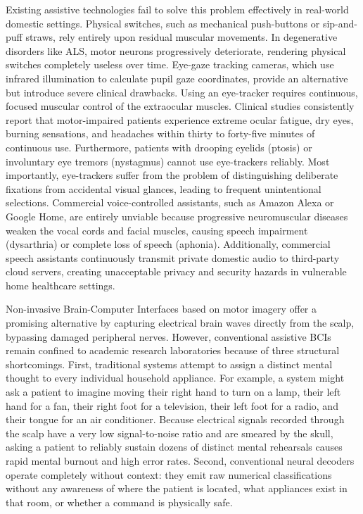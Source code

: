 \documentclass[12pt,a4paper]{report}
\begin{document}
Existing assistive technologies fail to solve this problem effectively in real-world domestic settings. Physical switches, such as mechanical push-buttons or sip-and-puff straws, rely entirely upon residual muscular movements. In degenerative disorders like ALS, motor neurons progressively deteriorate, rendering physical switches completely useless over time. Eye-gaze tracking cameras, which use infrared illumination to calculate pupil gaze coordinates, provide an alternative but introduce severe clinical drawbacks. Using an eye-tracker requires continuous, focused muscular control of the extraocular muscles. Clinical studies consistently report that motor-impaired patients experience extreme ocular fatigue, dry eyes, burning sensations, and headaches within thirty to forty-five minutes of continuous use. Furthermore, patients with drooping eyelids (ptosis) or involuntary eye tremors (nystagmus) cannot use eye-trackers reliably. Most importantly, eye-trackers suffer from the problem of distinguishing deliberate fixations from accidental visual glances, leading to frequent unintentional selections. Commercial voice-controlled assistants, such as Amazon Alexa or Google Home, are entirely unviable because progressive neuromuscular diseases weaken the vocal cords and facial muscles, causing speech impairment (dysarthria) or complete loss of speech (aphonia). Additionally, commercial speech assistants continuously transmit private domestic audio to third-party cloud servers, creating unacceptable privacy and security hazards in vulnerable home healthcare settings.

Non-invasive Brain-Computer Interfaces based on motor imagery offer a promising alternative by capturing electrical brain waves directly from the scalp, bypassing damaged peripheral nerves. However, conventional assistive BCIs remain confined to academic research laboratories because of three structural shortcomings. First, traditional systems attempt to assign a distinct mental thought to every individual household appliance. For example, a system might ask a patient to imagine moving their right hand to turn on a lamp, their left hand for a fan, their right foot for a television, their left foot for a radio, and their tongue for an air conditioner. Because electrical signals recorded through the scalp have a very low signal-to-noise ratio and are smeared by the skull, asking a patient to reliably sustain dozens of distinct mental rehearsals causes rapid mental burnout and high error rates. Second, conventional neural decoders operate completely without context: they emit raw numerical classifications without any awareness of where the patient is located, what appliances exist in that room, or whether a command is physically safe.
\end{document}
